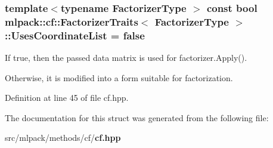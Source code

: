 \subsubsection[{Uses\+Coordinate\+List}]{\setlength{\rightskip}{0pt plus 5cm}template$<$typename Factorizer\+Type $>$ const bool {\bf mlpack\+::cf\+::\+Factorizer\+Traits}$<$ Factorizer\+Type $>$\+::Uses\+Coordinate\+List = false\hspace{0.3cm}{\ttfamily [static]}}\label{structmlpack_1_1cf_1_1FactorizerTraits_a743e4a7898ba755119696a21fae0d2a1}


If true, then the passed data matrix is used for factorizer.\+Apply(). 

Otherwise, it is modified into a form suitable for factorization. 

Definition at line 45 of file cf.\+hpp.



The documentation for this struct was generated from the following file\+:\begin{DoxyCompactItemize}
\item 
src/mlpack/methods/cf/{\bf cf.\+hpp}\end{DoxyCompactItemize}
